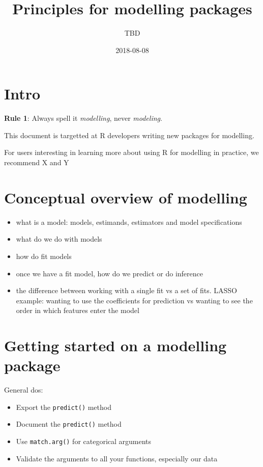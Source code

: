 \documentclass[]{book}
\title{Principles for modelling packages}
\author{TBD}
\date{2018-08-08}
\providecommand{\tightlist}{%
  \setlength{\itemsep}{0pt}\setlength{\parskip}{0pt}}
\theoremstyle{definition}
\theoremstyle{definition}
\theoremstyle{definition}
\theoremstyle{remark}
\begin{document}
\maketitle

{
\setcounter{tocdepth}{1}
\tableofcontents
}
\chapter{Intro}\label{intro}

\textbf{Rule 1}: Always spell it \emph{modelling}, never
\emph{modeling}.

This document is targetted at R developers writing new packages for
modelling.

For users interesting in learning more about using R for modelling in
practice, we recommend X and Y

\chapter{Conceptual overview of
modelling}\label{conceptual-overview-of-modelling}

\begin{itemize}
\item
  what is a model: models, estimands, estimators and model
  specifications
\item
  what do we do with models
\item
  how do fit models
\item
  once we have a fit model, how do we predict or do inference
\item
  the difference between working with a single fit vs a set of fits.
  LASSO example: wanting to use the coefficients for prediction vs
  wanting to see the order in which features enter the model
\end{itemize}

\chapter{Getting started on a modelling
package}\label{getting-started-on-a-modelling-package}

General dos:

\begin{itemize}
\tightlist
\item
  Export the \texttt{predict()} method
\item
  Document the \texttt{predict()} method
\item
  Use \texttt{match.arg()} for categorical arguments
\item
  Validate the arguments to all your functions, especially our data
\end{itemize}
\end{document}
